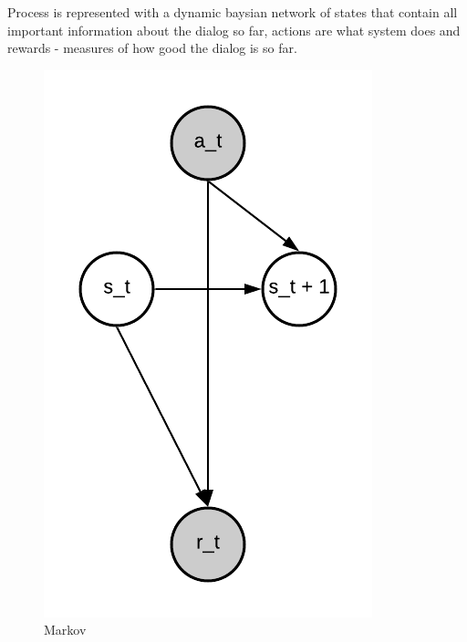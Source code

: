 \documentclass[12pt,titlepage,a4paper]{article}
\begin{document}
Process is represented with a dynamic baysian network of states that contain all important information about the dialog so far, actions are what system does and rewards - measures of how good the dialog is so far.

\begin{figure}[!htb]
      \includegraphics[width=\linewidth]{markov.png}
      \caption{Markov}
    \endminipage\hfill

\end{figure}
\end{document}

